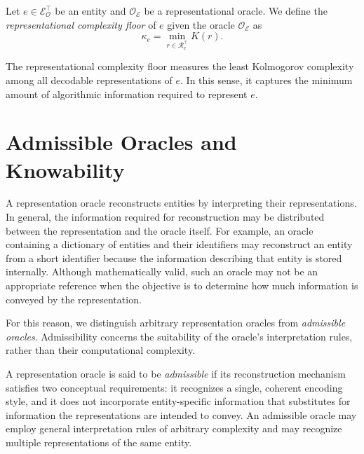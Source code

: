 \begin{definition}
\label{def:representational_complexity_floor}
Let $e \in \mathcal{E}_{\mathcal O}^{\top}$ be an entity and $\mathcal{O}_\mathcal{E}$ be a representational oracle. We define the \emph{representational complexity floor} of $e$ given the oracle $\mathcal{O}_\mathcal{E}$ as
\[
\kappa_e = \min_{r \in \mathcal{R}_{e}^{\top}} K(r).
\]
\end{definition}

The representational complexity floor measures the least Kolmogorov complexity among all decodable representations of $e$. In this sense, it captures the minimum amount of algorithmic information required to represent $e$.

%
%

\section{Admissible Oracles and Knowability}
\label{sec:admissible_oracles}

A representation oracle reconstructs entities by interpreting their representations. In general, the information required for reconstruction may be distributed between the representation and the oracle itself. For example, an oracle containing a dictionary of entities and their identifiers may reconstruct an entity from a short identifier because the information describing that entity is stored internally. Although mathematically valid, such an oracle may not be an appropriate reference when the objective is to determine how much information is conveyed by the representation.

For this reason, we distinguish arbitrary representation oracles from \emph{admissible oracles}. Admissibility concerns the suitability of the oracle's interpretation rules, rather than their computational complexity.

\begin{definition}
\label{def:admissible_oracle}
A representation oracle is said to be \emph{admissible} if its reconstruction mechanism satisfies two conceptual requirements: it recognizes a single, coherent encoding style, and it does not incorporate entity-specific information that substitutes for information the representations are intended to convey. An admissible oracle may employ general interpretation rules of arbitrary complexity and may recognize multiple representations of the same entity.
\end{definition}

